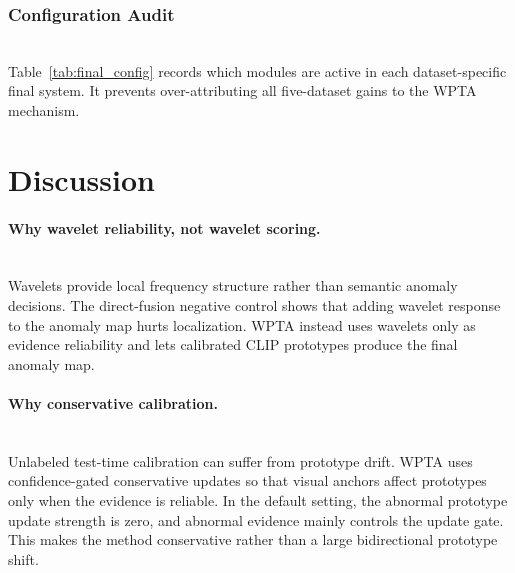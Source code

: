 \documentclass[runningheads]{llncs}
\begin{document}
\subsubsection{Configuration Audit}
\mbox{}\\
\noindent
Table~\ref{tab:final_config} records which modules are active in each dataset-specific final system. It prevents over-attributing all five-dataset gains to the WPTA mechanism.

\begin{table}[htbp]
  \centering
  \caption{Configuration audit for the five-dataset calibrated inference system.}
  \label{tab:final_config}
\end{table}

\section{Discussion}

\paragraph{Why wavelet reliability, not wavelet scoring.}\mbox{}\\
\noindent
Wavelets provide local frequency structure rather than semantic anomaly decisions. The direct-fusion negative control shows that adding wavelet response to the anomaly map hurts localization. WPTA instead uses wavelets only as evidence reliability and lets calibrated CLIP prototypes produce the final anomaly map.

\paragraph{Why conservative calibration.}\mbox{}\\
\noindent
Unlabeled test-time calibration can suffer from prototype drift. WPTA uses confidence-gated conservative updates so that visual anchors affect prototypes only when the evidence is reliable. In the default setting, the abnormal prototype update strength is zero, and abnormal evidence mainly controls the update gate. This makes the method conservative rather than a large bidirectional prototype shift.
\end{document}
